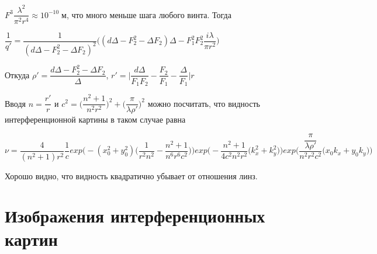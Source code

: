 $F^3 \dfrac{ \lambda^2}{\pi^2 r^4} \approx 10^{-10} \; м $, что много меньше шага любого винта. Тогда



$\dfrac{1}{q'}= \dfrac{1}{(d\Delta - F_{2}^2 -\Delta F_{2})^2} \Big((d\Delta - F_{2}^2 - \Delta F_{2})\Delta - F^{2}_{1}F^{2}_{2}\dfrac{i \lambda}{\pi r^2}\Big)$



Откуда $\rho ' =  \dfrac{d\Delta - F_{2}^2 - \Delta F_{2}}{\Delta}$, $r' = \Big |\dfrac{d\Delta}{F_{1}F_{2}} - \dfrac{F_{2}}{F_{1}} - \dfrac{\Delta}{F_{1}}\Big|r$




Вводя $n = \dfrac{r'}{r}$ и $c^2 = \Big(\dfrac{n^2 + 1}{n^2r^2}\Big) ^2 + \Big(\dfrac{\pi}{\lambda \rho '}\Big) ^2$ можно посчитать, что видность интерференционной картины в таком случае равна 



$\nu = \dfrac{4}{(n^2 + 1)r^2} \dfrac{1}{c} exp\Big(- (x_{0}^2 + y_{0}^2 ) \Big(\dfrac{1}{r^2n^2} - \dfrac{n^2 + 1}{n^6 r^6 c^2}\Big)\Big)  exp\Big( -\dfrac{n^2 + 1}{4 c^2 n^2 r^2}(k_{x}^2 + k_{y}^2\Big) \Big)exp\Big(  \dfrac{\dfrac{\pi}{\lambda \rho'}}{n^2 r^2 c^2}(x_{0}k_{x} + y_{0}k_{y}\Big)\Big)$


Хорошо видно, что видность квадратично убывает от отношения линз.

\chapter{Изображения интерференционных картин}\label{app:C}


\clearpage

%
